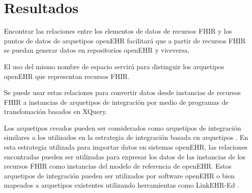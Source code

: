 \section{Resultados}

Encontrar las relaciones entre los elementos de datos de recursos FHIR y los puntos de datos de arquetipos openEHR facilitará que a partir de recursos FHIR se puedan generar datos en repositorios openEHR y viceversa.

El uso del mismo nombre de espacio servirá para distinguir los arquetipos openEHR que representan recursos FHIR.

Se puede usar estas relaciones para convertir datos desde instancias de recursos FHIR a instancias de arquetipos de integración por medio de programas de transfomación basados en XQuery.

Los arquetipos creados pueden ser considerados como arquetipos de integración similares a los utilizados en la estrategia de integración basada en arquetipos \cite{openEHRIntegration}. En esta estrategia utilizada para importar datos en sistemas openEHR, las relaciones encontradas pueden ser utilizadas para expresar los datos de las instancias de los recursos FHIR como instancias del modelo de referencia de openEHR. Estos arquetipos de integración pueden ser utilizados por software openEHR o bien mapeados a arquetipos existentes utilizando herramientas como LinkEHR-Ed \cite{Maldonado09}.




